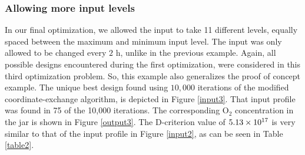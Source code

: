 \subsubsection{Allowing more input levels}
\label{Experiment3}
In our final optimization, we allowed the input to take 11 different levels, equally spaced between the maximum and minimum input level. The input was only allowed to be changed every $2 \text{ h}$, unlike in the previous example. Again, all possible designs encountered during the first optimization, were considered in this third optimization problem. So, this example also generalizes the proof of concept example. The unique best design found using $10,000$ iterations of the modified coordinate-exchange algorithm, is depicted in Figure \ref{input3}. That input profile was found in 75 of the 10,000 iterations. The corresponding $\text{O}_2$ concentration in the jar is shown in Figure \ref{output3}. The D-criterion value of {\color{red}$5.13\times 10^{17}$} is very similar to that of the input profile in Figure \ref{input2}, as can be seen in Table \ref{table2}.

